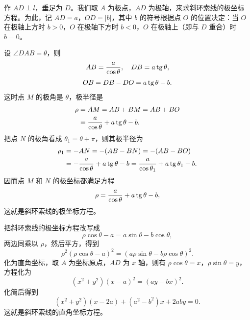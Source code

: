 作 $AD\perp l$，垂足为 $D$。我们取 $A$ 为极点，$AD$ 为极轴，来求斜环索线的极坐标方程。为此，记 $AD=a$，$OD=|b|$，其中 $b$ 的符号根据点 $O$ 的位置决定：当 $O$ 在极轴上方时 $b>0$，$O$ 在极轴下方时 $b<0$，$O$ 在极轴上（即与 $D$ 重合）时 $b=0$。

设 $\angle DAB=\theta$，则
\[
  AB = \frac{a}{\cos\theta},\quad DB = a\operatorname{tg}\theta,
\]
\[
  OB = DB - DO = a\operatorname{tg}\theta - b.
\]
这时点 $M$ 的极角是 $\theta$，极半径是
\begin{align*}
  \rho &= AM = AB + BM = AB + BO \\
       &= \frac{a}{\cos\theta} + a\operatorname{tg}\theta - b.
\end{align*}
把点 $N$ 的极角看成 $\theta_1=\theta+\pi$，则其极半径为
\begin{align*}
  \rho_1 &= -AN = -(AB - BN) = -(AB - BO) \\
         &= -\frac{a}{\cos\theta} + a\operatorname{tg}\theta - b = \frac{a}{\cos\theta_1} + a\operatorname{tg}\theta_1 - b.
\end{align*}
因而点 $M$ 和 $N$ 的极坐标都满足方程
\[
  \rho = \frac{a}{\cos\theta} + a\operatorname{tg}\theta - b,
\]
这就是斜环索线的极坐标方程。

把斜环索线的极坐标方程改写成
\[
  \rho\cos\theta - a = a\sin\theta - b\cos\theta,
\]
两边同乘以 $\rho$，然后平方，得到
\[
  \rho^2(\rho\cos\theta - a)^2 = (a\rho\sin\theta - b\rho\cos\theta)^2.
\]
化为直角坐标，取 $A$ 为坐标原点，$AD$ 为 $x$ 轴，则有 $\rho\cos\theta=x$，$\rho\sin\theta=y$，方程化为
\[
  (x^2+y^2)(x-a)^2 = (ay-bx)^2.
\]
化简后得到
\[
  (x^2+y^2)(x-2a) + (a^2-b^2)x + 2aby = 0.
\]
这就是斜环索线的直角坐标方程。
